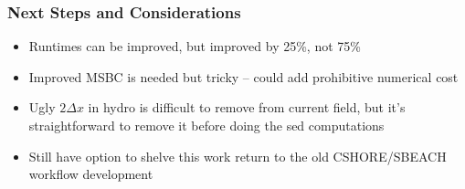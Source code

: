 \documentclass[aspectratio=169]{beamer}
\begin{document}
\begin{frame}
  \frametitle{Next Steps and Considerations} 
  \begin{itemize}
  \item Runtimes can be improved, but improved by 25\%, not 75\%
  \item Improved MSBC is needed but tricky -- could add prohibitive numerical cost
  \item Ugly $2 \Delta x$ in hydro is difficult to remove from current
    field, but it's straightforward to remove it before doing the sed
    computations
  \item Still have option to shelve this work return to the old CSHORE/SBEACH workflow development
  \end{itemize}


\end{frame}

  
\end{document}
